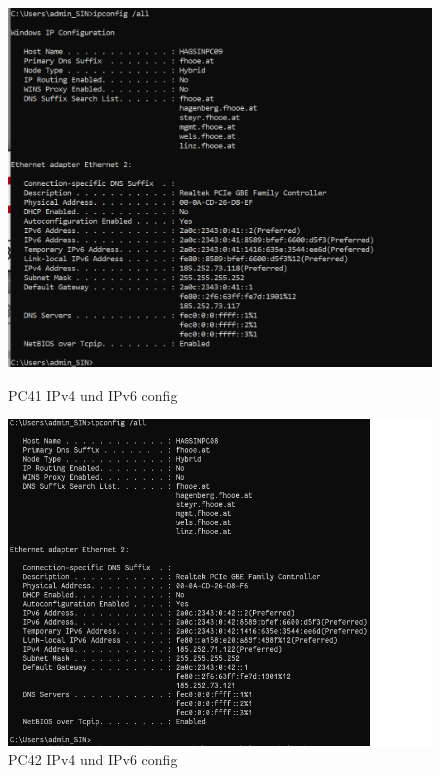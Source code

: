 \documentclass{article}
\begin{document}
\begin{figure}[!htp]
  \centering
  \begin{minipage}[b]{0.45\textwidth}
    \includegraphics[width=\textwidth]{Arbeitsergebnisse/pc41/pc41_ipconfig.PNG}
    \caption{PC41 IPv4 und IPv6 config}
  \end{minipage}
  \hspace{0.8cm}
  \begin{minipage}[b]{0.45\textwidth}
    \includegraphics[width=\textwidth]{Arbeitsergebnisse/pc42/pc42_ipconfig.PNG}
    \caption{PC42 IPv4 und IPv6 config}
  \end{minipage}
\end{figure}
\end{document}
